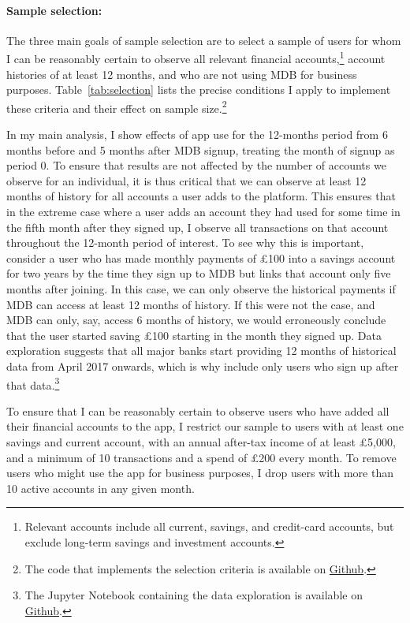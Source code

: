 \paragraph{Sample selection:}%
\label{par:sample_selection_}

The three main goals of sample selection are to select a sample of users for
whom I can be reasonably certain to observe all relevant financial
accounts,\footnote{Relevant accounts include all current, savings, and
credit-card accounts, but exclude long-term savings and investment accounts.}
account histories of at least 12 months, and who are not using MDB for business
purposes. Table~\ref{tab:selection} lists the precise conditions I apply to
implement these criteria and their effect on sample size.\footnote{The code
that implements the selection criteria is available on
\href{https://github.com/fabiangunzinger/mdb_eval/blob/main/src/data/selectors.py}{Github}.}

In my main analysis, I show effects of app use for the 12-months period from 6
months before and 5 months after MDB signup, treating the month of signup as
period 0. To ensure that results are not affected by the number of accounts we
observe for an individual, it is thus critical that we can observe at least 12
months of history for all accounts a user adds to the platform. This ensures
that in the extreme case where a user adds an account they had used for some
time in the fifth month after they signed up, I observe all transactions on
that account throughout the 12-month period of interest. To see why this is
important, consider a user who has made monthly payments of \pounds100 into a
savings account for two years by the time they sign up to MDB but links that
account only five months after joining. In this case, we can only observe the
historical payments if MDB can access at least 12 months of history. If this
were not the case, and MDB can only, say, access 6 months of history, we would
erroneously conclude that the user started saving \pounds100 starting in the
month they signed up. Data exploration suggests that all major banks start
providing 12 months of historical data from April 2017 onwards, which is why
include only users who sign up after that data.\footnote{The Jupyter Notebook
containing the data exploration is available on
\href{https://github.com/fabiangunzinger/mdb_eval/blob/371493bd78870cab7a303edb70687287e5bca4a9/notebooks/available_account_history.ipynb}{Github}.}

To ensure that I can be reasonably certain to observe users who have added all
their financial accounts to the app, I restrict our sample to users with at
least one savings and current account, with an annual after-tax income of at
least \pounds5,000, and a minimum of 10 transactions and a spend of \pounds200
every month. To remove users who might use the app for business purposes, I
drop users with more than 10 active accounts in any given month.

